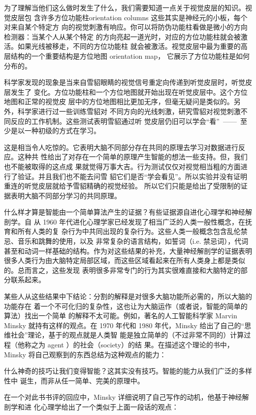 为了理解当他们这么做时发生了什么，我们需要知道一点关于视觉皮层的知识。视觉皮层包
含许多方位功能柱orientation columns 这些其实是神经元的小板，每个对来自某个特定方
向的视觉刺激有响应。你可以将防伪功能柱看做是微小的方向检测器：当某个人从某个特定
的方向亮起一道光时，对应的方位功能柱就会被激活。如果光线被移走，不同的方位功能柱
就会被激活。视觉皮层中最为重要的高层结构的一个重要结构是方位地图 orientation map，
它展示了方位功能柱是如何分布的。

科学家发现的现象是当来自雪貂眼睛的视觉信号重定向传递到听觉皮层时，听觉皮层发生了
变化。方位功能柱和一个方位地图就开始出现在听觉皮层中。这个方位地图和正常的视觉皮
层中的方位地图相比更加无序，但毫无疑问是类似的。另外，科学家进行过一些训练雪貂对
不同方向的光线刺激，研究雪貂对视觉刺激不同反应的工作机制。这些测试表明雪貂通过听
觉皮层仍旧可以学会“看”~——~至少是以一种初级的方式在学习。

这是相当令人吃惊的。它表明大脑不同部分存在共同的原理去学习对数据进行反应。这种共
性给出了对存在一个简单的原理产生智能的想法一些支持。但，我们也不能被取得的这点成
果就觉得万事大吉。行为测试仅仅对视觉相当粗的方面进行了验证。并且我们也不能去问雪
貂它们是否“学会看见”。所以实验并没有证明重连的听觉皮层就给予雪貂精确的视觉经验。
所以它们只能是给出了受限制的证据表明大脑不同部分学习的共同原理。

什么样才算是智能由一个简单算法产生的证据？有些证据源自进化心理学和神经解剖学。自
从 1960 年代进化心理学家已经发现了相当广泛的人类一般性概念，在抚育和所有人类的复
杂行为中共同出现的复杂行为。这些人类一般概念包含乱伦禁忌、音乐和跳舞的使用，以及
非常复杂的语言结构，如誓词（i.e. 禁忌词），代词甚至和动词一样基础的结构。作为对这些结果的补充，大量神经解剖学的证据表明很多人类行为由大脑特定局部区域，而这些区域看起来在所有人类身上都是类似的。总而言之，这些发现
表明很多非常专门的行为其实很难直接和大脑特定的部分联系起来。

某些人从这些结果中下结论：分割的解释是对很多大脑功能所必需的，所以大脑的功能存在
着一个不可化归的复杂性，这也让为大脑运作（或者说，智能的简单的算法）找出一个简单
的解释不太可能。例如，著名的人工智能科学家 Marvin Minsky 就持有这样的观点。在
1970 年代和 1980 年代，Minsky 给出了自己的“思维社会”理论，基于的观点就是人类智
能是独立简单的（不过非常不同的）计算过程（他称之为 agent ）的社会（society）的结
果。在描述这个理论的书中，Minsky 将自己观察到的东西总结为这种观点的能力：

    什么神奇的技巧让我们变得智能？这其实没有技巧。智能的能力从我们广泛的多样性中
    诞生，而非从任一简单、完美的原理中。

在一个对此书书评的回应中，Minsky 详细说明了自己写作的动机，他基于神经解剖学和进
化心理学给出了一个类似于上面一段话的观点：

